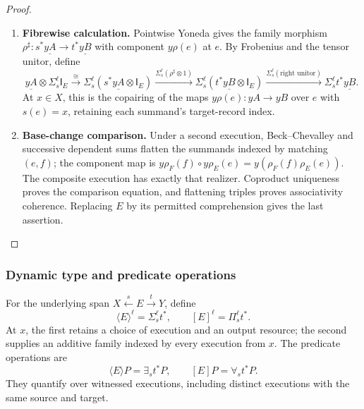 \documentclass[11pt,a4paper]{article}
\numberwithin{equation}{section}
\theoremstyle{definition}
\theoremstyle{remark}
\theoremstyle{plain}
\providecommand{\I}{\mathsf{I}}
\begin{document}
\begin{proof}
\leavevmode
\begin{enumerate}[label=\textup{(\arabic*)},leftmargin=*,itemsep=4pt,topsep=3pt]
  \item \textbf{Fibrewise calculation.} Pointwise Yoneda gives the family morphism
$\rho^\sharp:s^*\underline{yA}\to t^*\underline{yB}$ with component
$y\rho(e)$ at $e$. By Frobenius and the tensor unitor, define
\[
 \underline{yA}\otimes\Sigma_s^\ell\I_E
 \xrightarrow{\cong}
 \Sigma_s^\ell(s^*\underline{yA}\otimes\I_E)
 \xrightarrow{\Sigma_s^\ell(\rho^\sharp\otimes1)}
 \Sigma_s^\ell(t^*\underline{yB}\otimes\I_E)
 \xrightarrow{\Sigma_s^\ell(\text{right unitor})}
 \Sigma_s^\ell t^*\underline{yB}.
\]
At $x\in X$, this is the copairing of the maps
$y\rho(e):yA\to yB$ over $e$ with $s(e)=x$, retaining each summand's
target-record index.
  \item \textbf{Base-change comparison.} Under a second execution, Beck--Chevalley and
successive dependent sums flatten the summands indexed by matching
$(e,f)$; the component map is
$y\rho_F(f)\circ y\rho_E(e)=y(\rho_F(f)\rho_E(e))$. The composite execution has exactly that realizer. Coproduct uniqueness
proves the comparison equation, and flattening triples proves associativity
coherence. Replacing $E$ by its permitted comprehension gives the last
assertion.
\end{enumerate}
\end{proof}


\subsubsection{Dynamic type and predicate operations}

For the underlying span $X\xleftarrow{s}E\xrightarrow{t}Y$, define
\[
 \langle E\rangle^\ell=\Sigma_s^\ell t^*,\qquad
 [E]^\ell=\Pi_s^\ell t^*.
\]
At $x$, the first retains a choice of execution and an output resource;
the second supplies an additive family indexed by every execution from
$x$. The predicate operations are
\[
 \langle E\rangle P=\exists_s t^*P,\qquad
 [E]P=\forall_s t^*P.
\]
They quantify over witnessed executions, including distinct executions with
the same source and target.
\end{document}
